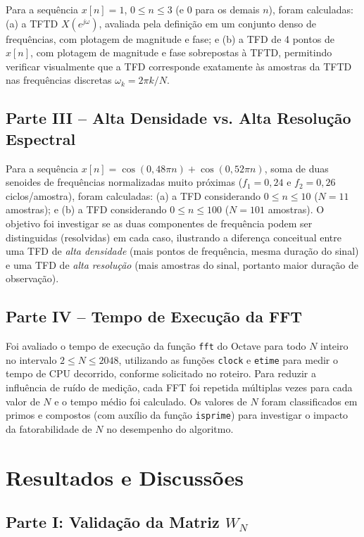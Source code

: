 \documentclass[tcc]{classe_uftex/uftex}
\begin{document}
Para a sequência $x[n] = 1$, $0 \leq n \leq 3$ (e $0$ para os demais $n$), foram calculadas: (a) a TFTD $X(e^{j\omega})$, avaliada pela definição em um conjunto denso de frequências, com plotagem de magnitude e fase; e (b) a TFD de 4 pontos de $x[n]$, com plotagem de magnitude e fase sobrepostas à TFTD, permitindo verificar visualmente que a TFD corresponde exatamente às amostras da TFTD nas frequências discretas $\omega_k = 2\pi k/N$.

\section{Parte III -- Alta Densidade vs. Alta Resolução Espectral}

Para a sequência $x[n] = \cos(0{,}48\pi n) + \cos(0{,}52\pi n)$, soma de duas senoides de frequências normalizadas muito próximas ($f_1 = 0{,}24$ e $f_2 = 0{,}26$ ciclos/amostra), foram calculadas: (a) a TFD considerando $0 \leq n \leq 10$ ($N=11$ amostras); e (b) a TFD considerando $0 \leq n \leq 100$ ($N=101$ amostras). O objetivo foi investigar se as duas componentes de frequência podem ser distinguidas (resolvidas) em cada caso, ilustrando a diferença conceitual entre uma TFD de \emph{alta densidade} (mais pontos de frequência, mesma duração do sinal) e uma TFD de \emph{alta resolução} (mais amostras do sinal, portanto maior duração de observação).

\section{Parte IV -- Tempo de Execução da FFT}

Foi avaliado o tempo de execução da função \texttt{fft} do Octave para todo $N$ inteiro no intervalo $2 \leq N \leq 2048$, utilizando as funções \texttt{clock} e \texttt{etime} para medir o tempo de CPU decorrido, conforme solicitado no roteiro. Para reduzir a influência de ruído de medição, cada FFT foi repetida múltiplas vezes para cada valor de $N$ e o tempo médio foi calculado. Os valores de $N$ foram classificados em primos e compostos (com auxílio da função \texttt{isprime}) para investigar o impacto da fatorabilidade de $N$ no desempenho do algoritmo.

\chapter{Resultados e Discussões}

\section{Parte I: Validação da Matriz $W_N$}
\end{document}
